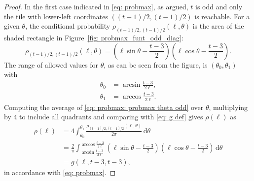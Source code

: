 \documentclass[12pt, a4paper]{article}
\newcommand{\diff}{\,\mathrm d}
\newcommand{\probmax}{\rho} %
\newcommand{\len}{\ell} %
\newcommand{\tiles}{t} %
\begin{document}
\begin{proof}
In the first case indicated in \eqref{eq: probmax}, as argued, $\tiles$ is odd and only the tile with lower-left coordinates $((\tiles-1)/2, (\tiles-1)/2)$ is reachable. For a given $\theta$, the conditional probability $\probmax_{(\tiles-1)/2, (\tiles-1)/2}(\len, \theta)$ is the area of the shaded rectangle in Figure~\ref{fig: probmax_funt_odd_diag}:
\begin{equation}
\label{eq: probmax: probmax theta odd}
\probmax_{(\tiles-1)/2, (\tiles-1)/2}(\len, \theta) = \left(\len\sin\theta - \frac{\tiles-3}2\right) \left(\len\cos\theta - \frac{\tiles-3}2\right).
\end{equation}
The range of allowed values for $\theta$, as can be seen from the figure, is $(\theta_0, \theta_1)$ with
\begin{align}
\label{eq: odd theta 0}
\theta_0 & = \arcsin\frac{\tiles-3}{2\len}, \\
\label{eq: odd theta 1}
\theta_1 & = \arccos\frac{\tiles-3}{2\len}.
\end{align}
Computing the average of \eqref{eq: probmax: probmax theta odd} over $\theta$, multiplying by $4$ to include all quadrants and comparing with \eqref{eq: g def} gives $\probmax(\len)$ as
\begin{equation}
\label{eq: probmax: probmax odd}
\begin{split}
\probmax(\len) & = 4 \int_{\theta_0}^{\theta_1} \frac{\probmax_{(\tiles-1)/2, (\tiles-1)/2}(\len, \theta)}{2\pi} \diff \theta \\
& = \frac 2 \pi \int_{\arcsin\frac{\tiles-3}{2\len}}^{\arccos\frac{\tiles-3}{2\len}} \left( \len\sin\theta - \frac{\tiles-3} 2 \right)  \left( \len\cos\theta - \frac{\tiles-3} 2 \right) \diff \theta \\
& = g\left( \len, \tiles-3, \tiles-3 \right ),
\end{split}
\end{equation}
in accordance with \eqref{eq: probmax}.


\end{proof}
\end{document}

